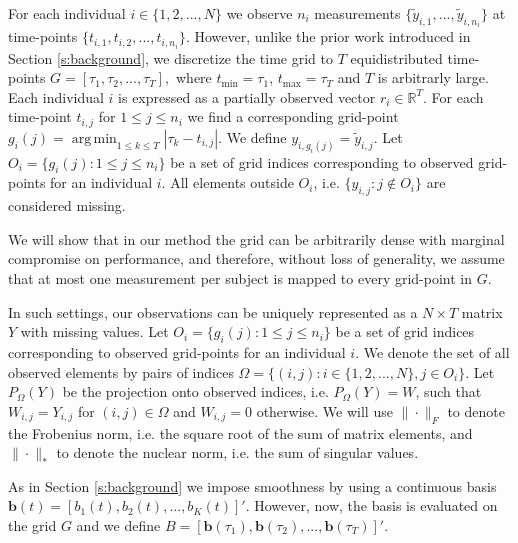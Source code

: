 \documentclass[preprint]{imsart}
\numberwithin{equation}{section}
\theoremstyle{plain}
\newcommand{\R}{\mathbb{R}}
\newcommand{\bb}{\mathbf{b}}
\DeclareMathOperator*{\argmin}{arg\,min}
\begin{document}
For each individual $i \in \{1,2,...,N\}$ we observe $n_i$ measurements $\{\tilde y_{i,1},...,\tilde y_{i,n_i}\}$ at time-points $\{t_{i,1},t_{i,2},...,t_{i,n_i}\}$. However, unlike the prior work introduced in Section \ref{s:background}, we discretize the time grid to $T$ equidistributed time-points $G = \left[\tau_1, \tau_2, ..., \tau_T\right],$ where $t_{\min} = \tau_1$, $t_{\max} = \tau_T$ and $T$ is arbitrarly large. Each individual $i$ is expressed as a partially observed vector $r_i \in \R^T$. For each time-point $t_{i,j}$ for $1 \leq j \leq n_i$ we find a corresponding grid-point $g_i(j) = \argmin_{1 \leq k \leq T}  |\tau_k - t_{i,j}|$. We define $y_{i,g_i(j)} = \tilde y_{i,j}$. Let $O_i = \{g_i(j): 1 \leq j \leq n_i \}$ be a set of grid indices corresponding to observed grid-points for an individual $i$. All elements outside $O_i$, i.e. $\{y_{i,j} : j \notin O_i\}$ are considered missing.

We will show that in our method the grid can be arbitrarily dense with marginal compromise on performance, and therefore, without loss of generality, we assume that at most one measurement per subject is mapped to every grid-point in $G$.

In such settings, our observations can be uniquely represented as a $N \times T$ matrix $Y$ with missing values. Let $O_i = \{g_i(j): 1 \leq j \leq n_i \}$ be a set of grid indices corresponding to observed grid-points for an individual $i$. We denote the set of all observed elements by pairs of indices $\Omega = \{ (i,j) : i\in \{1,2,...,N\}, j \in O_i \}$. Let $P_\Omega(Y)$ be the projection onto observed indices, i.e. $P_\Omega(Y) = W$, such that $W_{i,j} = Y_{i,j}$ for $(i,j) \in \Omega$ and $W_{i,j} = 0$ otherwise. We will use $\|\cdot\|_F$ to denote the Frobenius norm, i.e. the square root of the sum of matrix elements, and $\|\cdot\|_*$ to denote the nuclear norm, i.e. the sum of singular values.

As in Section \ref{s:background} we impose smoothness by using a continuous basis $\bb(t) = [b_1(t),b_2(t),...,b_K(t)]'$. However, now, the basis is evaluated on the grid $G$ and we define $B = [\bb(\tau_1),\bb(\tau_2),...,\bb(\tau_T)]'$.
\end{document}
